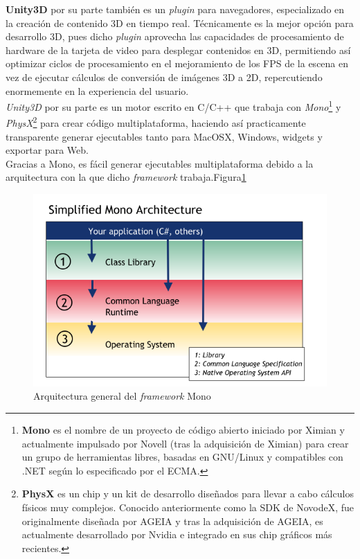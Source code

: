 \textbf{Unity3D} por su parte también es un \emph{plugin} para navegadores, especializado en la creación de contenido 3D en tiempo real. Técnicamente es la mejor opción para desarrollo 3D, pues dicho \emph{plugin} aprovecha las capacidades de procesamiento de hardware de la tarjeta de video para desplegar contenidos en 3D, permitiendo así optimizar ciclos de procesamiento en el mejoramiento de los FPS de la escena en vez de ejecutar cálculos de conversión de imágenes 3D a 2D, repercutiendo enormemente en la experiencia del usuario.\\

\emph{Unity3D} por su parte es un motor escrito en C/C++ que trabaja con \emph{Mono}\footnote{\textbf{Mono} es el nombre de un proyecto de código abierto iniciado por Ximian y actualmente impulsado por Novell (tras la adquisición de Ximian) para crear un grupo de herramientas libres, basadas en GNU/Linux y compatibles con .NET según lo especificado por el ECMA.} y \emph{PhysX}\footnote{\textbf{PhysX} es un chip y un kit de desarrollo diseñados para llevar a cabo cálculos físicos muy complejos. Conocido anteriormente como la SDK de NovodeX, fue originalmente diseñada por AGEIA y tras la adquisición de AGEIA, es actualmente desarrollado por Nvidia e integrado en sus chip gráficos más recientes.} para crear código multiplataforma, haciendo así practicamente transparente generar ejecutables tanto para MacOSX, Windows, widgets y exportar para Web.\\

Gracias a Mono, es fácil generar ejecutables multiplataforma debido a la arquitectura con la que dicho \emph{framework} trabaja.Figura\ref{fig:mono}\\

\begin{figure}[h]
	\centering
		\includegraphics[scale=0.7]{Mono.PNG}
		\caption{Arquitectura general del \emph{framework} Mono}
	\label{fig:mono}
\end{figure}


